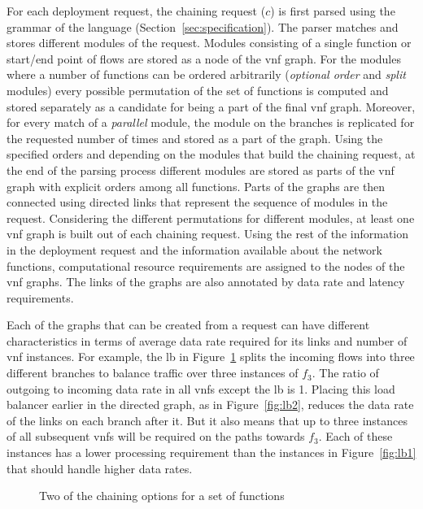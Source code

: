 \documentclass[10pt,a4paper,conference]{IEEEtran}
\begin{document}
For each deployment request, the chaining request ($ c $) is first parsed using 
the grammar of the language (Section~\ref{sec:specification}). The parser 
matches and stores different modules of the request. Modules consisting of a single
function or start/end point of flows are stored as a node of the \ac{vnf} graph. 
For the modules where a number of functions can be ordered arbitrarily (\emph{optional order} and 
\emph{split} modules) every possible permutation of the set of functions is computed
and stored separately as a candidate for being a part of the final \ac{vnf} graph.
Moreover, for every match of a \emph{parallel} module, the module on 
the branches is replicated for the requested number of times and stored as a part
of the graph. Using the specified orders and depending on the modules that build 
the chaining request, at the end of the parsing process different modules are stored
as parts of the \ac{vnf} graph with explicit orders among all functions. Parts
of the graphs are then connected using directed links that represent the sequence 
of modules in the request. Considering the different permutations for different 
modules, at least one \ac{vnf} graph is built out of each chaining request. 
Using the rest of the information in the deployment request and the information 
available about the network functions, computational resource requirements are 
assigned to the nodes of the \ac{vnf} graphs. The links of the graphs are also
annotated by data rate and latency requirements. 

Each of the graphs that can be created from a request can have different characteristics 
in terms of average data rate required for its links and number of \ac{vnf} instances. 
For example, the \ac{lb} in Figure~\ref{fig:lb} splits the incoming flows into 
three different branches to balance 
traffic over three instances of $ f_3 $. The ratio of outgoing to incoming data 
rate in all \acp{vnf} except the \ac{lb} is 1. Placing this load balancer earlier in
the directed graph, as in Figure~\ref{fig:lb2}, reduces the data rate of the 
links on each branch after it. But it also means that up to three instances of
all subsequent \acp{vnf} will be required on the paths towards $ f_3 $. Each of
these instances has a lower processing requirement than the instances
in Figure~\ref{fig:lb1} that should handle higher data rates.

\begin{figure}[!t]
\hfil
{}
\caption{Two of the chaining options for a set of functions}
\label{fig:lb}
\vspace{-3mm}
\end{figure}
\end{document}
